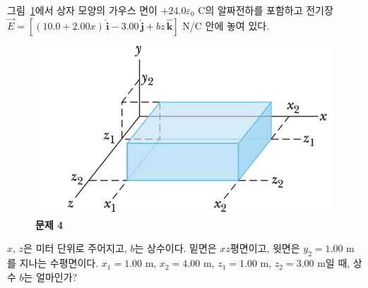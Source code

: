 \documentclass[tightenlines,floatfix,nofootinbib,superscriptaddress,fleqn]{revtex4-2}
\begin{document}
 그림~\ref{fig:3}에서 상자 모양의 가우스
면이 $+24.0\varepsilon_0$ C의 알짜전하를 포함하고 전기장
$\vec{E}=[(10.0 + 2.00x)\,\hat{\bm{i}}-3.00\,\hat{\bm{j}}+
  bz\,\hat{\bm{k}}]$ N/C 안에 놓여 있다. 
\begin{figure}[htp]
  \centering
  \includegraphics[scale=0.6]{qfig3-3.png}
  \caption{\textbf{문제 4}}
  \label{fig:3}
\end{figure}
$x$, $z$은 미터 단위로
  주어지고, $b$는 상수이다. 밑면은 $xz$평면이고, 윗면은 $y_2=1.00$ m를
  지나는 수평면이다. $x_1=1.00$ m, $x_2=4.00$ m, $z_1= 1.00$ m,
  $z_2=3.00$ m일 때, 상수 $b$는 얼마인가? 
\vspace{0.5cm}


\vspace{0.5cm}
\end{document}
